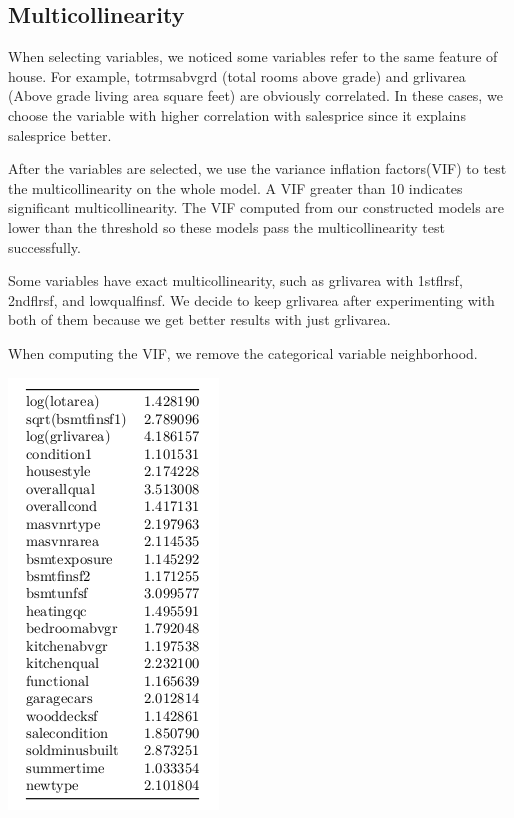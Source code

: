 \documentclass[12pt]{article}
\begin{document}
\begin{flushleft}
\begin{center}
\begin{tabular}{|c|c|c|}
\end{tabular}
\end{center}
\begin{samepage}
\centering
\section{Multicollinearity}
\begin{flushleft}When selecting variables, we noticed some variables refer to the same feature of house. For example, totrmsabvgrd (total rooms above grade) and grlivarea (Above grade living area square feet) are obviously correlated. In these cases, we choose the variable with higher correlation with salesprice since it explains salesprice better. 

After the variables are selected, we  use the variance inflation factors(VIF) to test the multicollinearity on the whole model. A VIF greater than 10 indicates significant multicollinearity. The VIF computed from our constructed models are lower than the threshold so these models pass the multicollinearity test successfully.

Some variables have exact multicollinearity, such as grlivarea with 1stflrsf, 2ndflrsf, and lowqualfinsf. We decide to keep grlivarea after experimenting with both of them because we get better results with just grlivarea. 

When computing the VIF, we remove the categorical variable neighborhood.
\end{flushleft}
\centering
    \vspace*{0.5 cm}
    \includegraphics[scale = .5]{vif.png}\\[1.0 cm]	



\end{samepage}
\end{flushleft}
\end{document}
